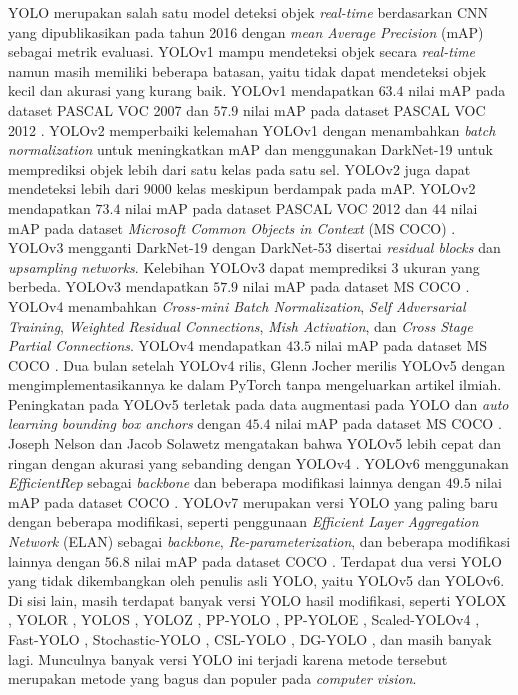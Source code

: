     YOLO merupakan salah satu model deteksi objek \textit{real-time} berdasarkan CNN yang dipublikasikan pada tahun 2016 dengan \textit{mean Average Precision} (mAP) sebagai metrik evaluasi. YOLOv1 mampu mendeteksi objek secara \textit{real-time} namun masih memiliki beberapa batasan, yaitu tidak dapat mendeteksi objek kecil dan akurasi yang kurang baik. YOLOv1 mendapatkan $63.4$ nilai mAP pada dataset PASCAL VOC 2007 dan $57.9$ nilai mAP pada dataset PASCAL VOC 2012 \citep{Redmon2016a}. YOLOv2 memperbaiki kelemahan YOLOv1 dengan menambahkan \textit{batch normalization} untuk meningkatkan mAP dan menggunakan DarkNet-19 untuk memprediksi objek lebih dari satu kelas pada satu sel. YOLOv2 juga dapat mendeteksi lebih dari 9000 kelas meskipun berdampak pada mAP. YOLOv2 mendapatkan $73.4$ nilai mAP pada dataset PASCAL VOC 2012 dan $44$ nilai mAP pada dataset \textit{Microsoft Common Objects in Context} (MS COCO) \citep{Redmon2017}. YOLOv3 mengganti DarkNet-19 dengan DarkNet-53 disertai \textit{residual blocks} dan \textit{upsampling networks}. Kelebihan YOLOv3 dapat memprediksi 3 ukuran yang berbeda. YOLOv3 mendapatkan $57.9$ nilai mAP pada dataset MS COCO \citep{Redmon2018}. YOLOv4 menambahkan \textit{Cross-mini Batch Normalization}, \textit{Self Adversarial Training}, \textit{Weighted Residual Connections}, \textit{Mish Activation}, dan \textit{Cross Stage Partial Connections}. YOLOv4 mendapatkan $43.5$ nilai mAP pada dataset MS COCO \citep{Bochkovskiy2020}. Dua bulan setelah YOLOv4 rilis, Glenn Jocher merilis YOLOv5 dengan mengimplementasikannya ke dalam PyTorch tanpa mengeluarkan artikel ilmiah. Peningkatan pada YOLOv5 terletak pada data augmentasi pada YOLO dan \textit{auto learning bounding box anchors} dengan $45.4$ nilai mAP pada dataset MS COCO \citep{Jocher2020}. Joseph Nelson dan Jacob Solawetz mengatakan bahwa YOLOv5 lebih cepat dan ringan dengan akurasi yang sebanding dengan YOLOv4 \citep{Nelson2020}. YOLOv6 menggunakan \textit{EfficientRep} sebagai \textit{backbone} dan beberapa modifikasi lainnya dengan $49.5$ nilai mAP pada dataset COCO \citep{Li2022}. YOLOv7 merupakan versi YOLO yang paling baru dengan beberapa modifikasi, seperti penggunaan \textit{Efficient Layer Aggregation Network} (ELAN) sebagai \textit{backbone}, \textit{Re-parameterization}, dan beberapa modifikasi lainnya dengan $56.8$ nilai mAP pada dataset COCO \citep{Wang2022}. Terdapat dua versi YOLO yang tidak dikembangkan oleh penulis asli YOLO, yaitu YOLOv5 dan YOLOv6. Di sisi lain, masih terdapat banyak versi YOLO hasil modifikasi, seperti YOLOX \citep{Ge2021}, YOLOR \citep{Zhu2021a}, YOLOS \citep{Wolf2020a}, YOLOZ \citep{Benjumea2021}, PP-YOLO \citep{Long2020}, PP-YOLOE \citep{Xu2022}, Scaled-YOLOv4 \citep{ScaledYOLOv4Wang2021}, Fast-YOLO \citep{Shaifee2017}, Stochastic-YOLO \cite{Azevedo2020}, CSL-YOLO \citep{Zhang2021b}, DG-YOLO \citep{Liu2020}, dan masih banyak lagi. Munculnya banyak versi YOLO ini terjadi karena metode tersebut merupakan metode yang bagus dan populer pada \textit{computer vision}.

